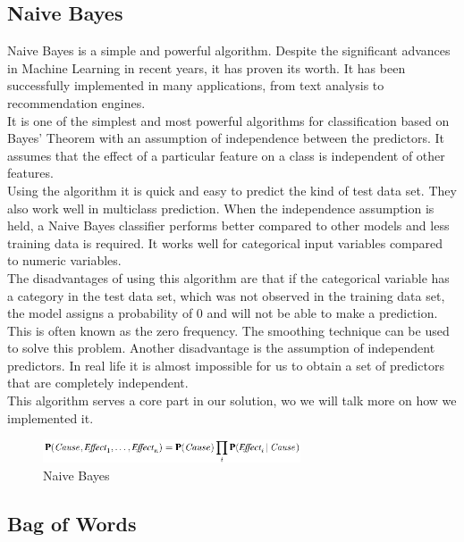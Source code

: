 \documentclass[sigconf,12pt,review=false,natbib=false]{acmart}
\begin{document}
\subsection{Naive Bayes}
Naive Bayes is a simple and powerful algorithm. Despite the significant advances in Machine Learning in recent
years, it has proven its worth. It has been successfully implemented in many applications, from text analysis
to recommendation engines. \\

It is one of the simplest and most powerful algorithms for classification based on Bayes' Theorem with an assumption
of independence between the predictors. It assumes that the effect of a particular feature on a class is independent
of other features. \\

Using the algorithm it is quick and easy to predict the kind of test data set. They also work well in multiclass
prediction. When the independence assumption is held, a Naive Bayes classifier performs better compared to other
models and less training data is required.
It works well for categorical input variables compared to numeric variables. \\

The disadvantages of using this algorithm are that if the categorical variable has a category in the test data set,
which was not observed in the training data set, the model assigns a probability of 0 and will not be able to make
a prediction. This is often known as the zero frequency. The smoothing technique can be used to solve this problem.
Another disadvantage is the assumption of independent predictors. In real life it is almost impossible for us to
obtain a set of predictors that are completely independent. \\

This algorithm serves a core part in our solution, wo we will talk more on how we implemented it.

\begin{figure}[h!]
    \centering
    \includegraphics[width=3in]{naive_bayes}
    \caption{Naive Bayes}
    \label{fig:naive_bayes}
\end{figure}


\subsection{Bag of Words}
\end{document}
